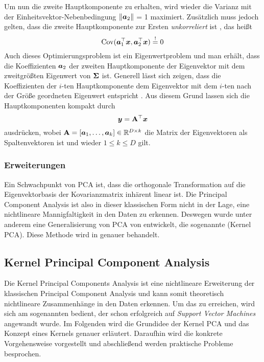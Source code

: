 Um nun die zweite Hauptkomponente zu erhalten, wird wieder die Varianz mit der
Einheitsvektor-Nebenbedingung $\lVert\bm{a}_2\rVert$ = 1 maximiert. Zusätzlich muss jedoch gelten,
dass die zweite Hauptkomponente zur Ersten \textit{unkorreliert} ist \parencite[5]{Jolliffe.2002}, das heißt
\begin{equation}
	\operatorname{Cov}(\bm{a}_1^\top\bm{x}, \bm{a}_2^\top\bm{x}) \overset{!}{=} 0
\end{equation}
Auch dieses Optimierungsproblem ist ein Eigenwertproblem und man erhält, dass die Koeffizienten $\bm{a}_2$ der zweiten Hauptkomponente der Eigenvektor mit dem zweitgrößten Eigenwert von $\mathbf{\Sigma}$ ist.
Generell lässt sich zeigen, dass die Koeffizienten der $i$-ten Hauptkomponente dem Eigenvektor mit dem $i$-ten nach der Größe geordneten Eigenwert entspricht \parencite[6]{Jolliffe.2002}. Aus diesem Grund lassen sich die Hauptkomponenten kompakt durch
\begin{equation}
	\bm{y} = \mathbf{A}^\top \bm{x}
\end{equation}
ausdrücken, wobei $\mathbf{A} = [\bm{a}_1,\ldots,\bm{a}_k] \in \mathbb{R}^{D \times k}$ die Matrix der Eigenvektoren als Spaltenvektoren ist und wieder $1 \leq k \leq D$ gilt.

\subsubsection{Erweiterungen}
\label{ch:MethodenDerDimRed:statistisch:PCA:Erweiterungen}

Ein Schwachpunkt von PCA ist, dass die orthogonale Transformation auf die Eigenvektorbasis der
Kovarianzmatrix inhärent linear ist. Die Principal Component Analysis ist also in dieser
klassischen Form nicht in der Lage, eine nichtlineare Mannigfaltigkeit in den Daten zu erkennen.
Deswegen wurde unter anderem eine Generalisierung von PCA von \textcite{Scholkopf.1997} entwickelt,
die sogenannte  (Kernel PCA). Diese Methode wird in
 genauer behandelt.

\subsection{Kernel Principal Component Analysis}
\label{ch:MethodenDerDimRed:statistisch:kPCA}
Die Kernel Principal Components Analysis \parencite{Scholkopf.1997} ist eine nichtlineare Erweiterung der klassischen Principal Component
Analysis und kann somit theoretisch nichtlineare Zusammenhänge in den Daten erkennen. Um das zu
erreichen, wird sich am sogenannten  bedient, der schon erfolgreich auf
\textit{Support Vector Machines} \parencite{Boser.1992} angewandt wurde. Im Folgenden wird die Grundidee der Kernel PCA und das Konzept
eines Kernels genauer erläutert. Daraufhin wird die konkrete Vorgehensweise vorgestellt und
abschließend werden praktische Probleme besprochen.

